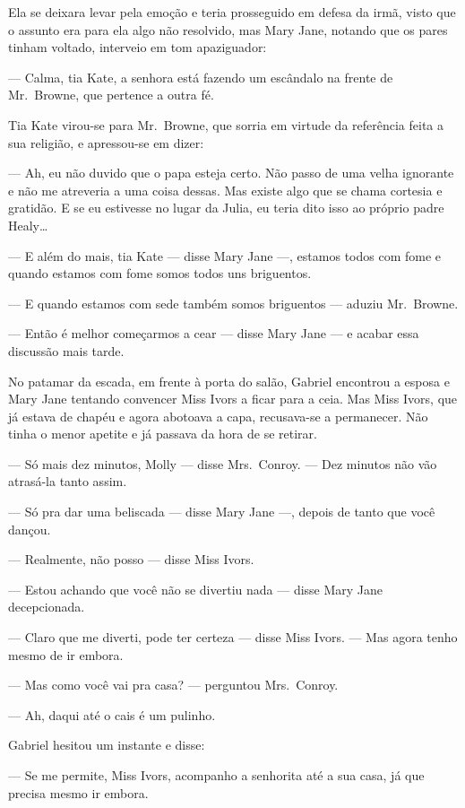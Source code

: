 Ela se deixara levar pela emoção e teria prosseguido em defesa da irmã, visto
que o assunto era para ela algo não resolvido, mas Mary Jane, notando que os
pares tinham voltado, interveio em tom apaziguador:

--- Calma, tia Kate, a senhora está fazendo um escândalo na frente de 
Mr.~Browne, que pertence a outra fé.

Tia Kate virou-se para Mr.~Browne, que sorria em virtude da referência feita a
sua religião, e apressou-se em dizer:

--- Ah, eu não duvido que o papa esteja certo.  Não passo de uma velha
ignorante e não me atreveria a uma coisa dessas.  Mas existe algo que se chama
cortesia e gratidão.  E se eu estivesse no lugar da Julia, eu teria dito isso
ao próprio padre Healy\ldots{}

--- E além do mais, tia Kate --- disse Mary Jane ---, estamos todos com fome e
quando estamos com fome somos todos uns briguentos.

--- E quando estamos com sede também somos briguentos --- aduziu Mr.~Browne.

--- Então é melhor começarmos a cear --- disse Mary Jane --- e acabar essa
discussão mais tarde.

No patamar da escada, em frente à porta do salão, Gabriel encontrou a esposa e
Mary Jane tentando convencer Miss Ivors a ficar para a ceia.  Mas Miss Ivors,
que já estava de chapéu e agora abotoava a capa, recusava-se a permanecer.  Não
tinha o menor apetite e já passava da hora de se retirar.

--- Só mais dez minutos, Molly --- disse Mrs.~Conroy.  --- Dez minutos não vão
atrasá-la tanto assim.

--- Só pra dar uma beliscada --- disse Mary Jane ---, depois de tanto que você
dançou.

--- Realmente, não posso --- disse Miss Ivors.

--- Estou achando que você não se divertiu nada --- disse Mary Jane
decepcionada.

--- Claro que me diverti, pode ter certeza --- disse Miss Ivors.  --- Mas agora
tenho mesmo de ir embora.

--- Mas como você vai pra casa? --- perguntou Mrs.~Conroy.

--- Ah, daqui até o cais é um pulinho.

Gabriel hesitou um instante e disse:

--- Se me permite, Miss Ivors, acompanho a senhorita até a sua casa, já que
precisa mesmo ir embora.

